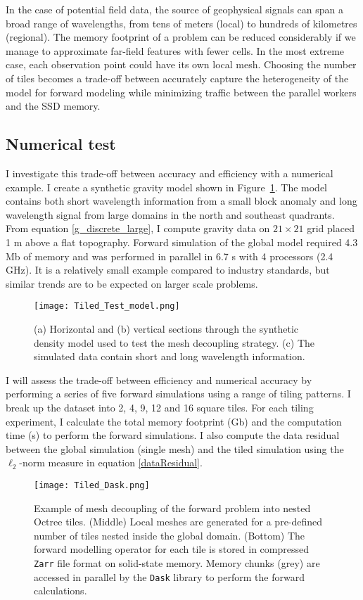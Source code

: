 In the case of potential field data, the source of geophysical signals can span a broad range of wavelengths, from tens of meters (local) to hundreds of kilometres (regional). The memory footprint of a problem can be reduced considerably if we manage to approximate far-field features with fewer cells. In the most extreme case, each observation point could have its own local mesh.
Choosing the number of tiles becomes a trade-off between accurately capture the heterogeneity of the model for forward modeling while minimizing traffic between the parallel workers and the SSD memory.

\subsection{Numerical test}
I investigate this trade-off between accuracy and efficiency with a numerical example.
I create a synthetic gravity model shown in Figure~\ref{Tiled_Test_model}. The model contains both short wavelength information from a small block anomaly and long wavelength signal from large domains in the north and southeast quadrants. From equation \eqref{g_discrete_large}, I compute gravity data on $21 \times 21$ grid placed 1 m above a flat topography.
Forward simulation of the global model required 4.3 Mb of memory and was performed in parallel in 6.7 s with 4 processors (2.4 GHz). It is a relatively small example compared to industry standards, but similar trends are to be expected on larger scale problems.
\begin{figure}[h!]
{\centering
\texttt{[image: Tiled\_Test\_model.png]}}
\caption{(a) Horizontal and (b) vertical sections through the synthetic density model used to test the mesh decoupling strategy. (c) The simulated data contain short and long wavelength information.}
\label{Tiled_Test_model}
\end{figure}

I will assess the trade-off between efficiency and numerical accuracy by performing a series of five forward simulations using a range of tiling patterns. I break up the dataset into 2, 4, 9, 12 and 16 square tiles.
For each tiling experiment, I calculate the total memory footprint (Gb) and the computation time (s) to perform the forward simulations. I also compute the data residual between the global simulation (single mesh) and the tiled simulation using the $\ell_2$-norm measure in equation \eqref{dataResidual}.
\begin{figure}[h!]
{\centering
\texttt{[image: Tiled\_Dask.png]}}
\caption{Example of mesh decoupling of the forward problem into nested Octree tiles. (Middle) Local meshes are generated for a pre-defined number of tiles nested inside the global domain. (Bottom) The forward modelling operator for each tile is stored in compressed \texttt{Zarr} file format on solid-state memory. Memory chunks (grey) are accessed in parallel by the \texttt{Dask} library to perform the forward calculations.}
\label{Tiled_Dask}
\end{figure}

